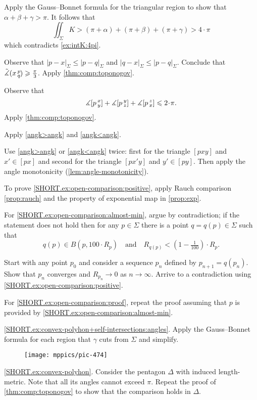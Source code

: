 Apply the Gauss--Bonnet formula for the triangular region to show that $\alpha+\beta+\gamma>\pi$.
It follows that 
\[\iint_\Sigma K>(\pi+\alpha)+(\pi+\beta)+(\pi+\gamma)>4\cdot\pi\]
which contradicts \ref{ex:intK:4pi}.


Observe that $|p-x|_\Sigma\le |p-q|_\Sigma$ and $|q-x|_\Sigma\le |p-q|_\Sigma$.
Conclude that $\tilde\measuredangle(x\,{}^{p}_{q}\hspace{-0.2ex})\geqslant \tfrac\pi3$.
Apply \ref{thm:comp:toponogov}.

Observe that 
\[\measuredangle\hinge pxy+\measuredangle\hinge pyz+\measuredangle\hinge pzx\le2\cdot \pi.\]
Apply \ref{thm:comp:toponogov}.

 Apply \ref{angk>angk} and \ref{angk<angk}.




 Use \ref{angk>angk} or \ref{angk<angk} twice:
first for the triangle $[pxy]$ and $x'\in [px]$
and 
second for the triangle $[px'y]$ and $y'\in [py]$.
Then apply the angle monotonicity (\ref{lem:angle-monotonicity}).

 To prove \ref{SHORT.ex:open-comparison:positive}, apply Rauch comparison \ref{prop:rauch} and the property of exponential map in \ref{prop:exp}.

For \ref{SHORT.ex:open-comparison:almost-min}, argue by contradiction;
if the statement does not hold then for any $p\in\Sigma$ there is a point $q=q(p)\in \Sigma$ such that 
\[
q(p)\in B(p,100\cdot R_p)
\quad\text{and}\quad
R_{q(p)}<(1-\tfrac1{100})\cdot R_p.
\]

Start with any point $p_0$ and consider a sequence $p_n$ defined by $p_{n+1}=q(p_n)$.
Show that $p_n$ converges and $R_{p_n}\to 0$ as $n\to\infty$.
Arrive to a contradiction using  \ref{SHORT.ex:open-comparison:positive}.

For \ref{SHORT.ex:open-comparison:proof}, repeat the proof assuming that $p$ is provided by \ref{SHORT.ex:open-comparison:almost-min}.

\parbf{\ref{ex:convex-polyhon+self-intersections};} \ref{SHORT.ex:convex-polyhon+self-intersections:angles}.
Apply the Gauss--Bonnet formula for each region that $\gamma$ cuts from $\Sigma$ and simplify.

\begin{wrapfigure}{r}{50 mm}
\vskip-0mm
\centering
\texttt{[image: mppics/pic-474]}
\vskip8mm
\end{wrapfigure}

\ref{SHORT.ex:convex-polyhon}. %
Consider the pentagon $\Delta$ with induced length-metric.
Note that all its angles cannot exceed $\pi$.
Repeat the proof of \ref{thm:comp:toponogov} to show that the comparison holds in $\Delta$.

